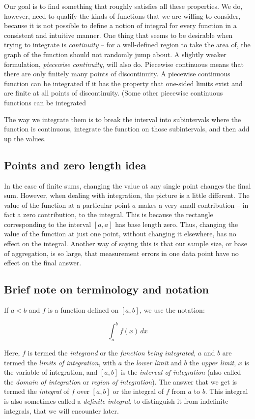 \documentclass{amsart}
\begin{document}
Our goal is to find something that roughly satisfies all these
properties. We do, however, need to qualify the kinds of functions
that we are willing to consider, because it is not possible to define
a notion of integral for every function in a consistent and intuitive
manner. One thing that seems to be desirable when trying to integrate
is {\em continuity} -- for a well-defined region to take the area of,
the graph of the function should not randomly jump about. A slightly
weaker formulation, {\em piecewise continuity}, will also
do. Piecewise continuous means that there are only finitely many
points of discontinuity. A piecewise continuous function can be
integrated if it has the property that one-sided limits exist and are
finite at all points of discontinuity. (Some other piecewise
continuous functions can be integrated 

The way we integrate them is to break the interval into subintervals
where the function is continuous, integrate the function on those
subintervals, and then add up the values.

\subsection{Points and zero length idea}

In the case of finite sums, changing the value at any single point
changes the final sum. However, when dealing with integration, the
picture is a little different. The value of the function at a
particular point $a$ makes a very small contribution -- in fact a zero
contribution, to the integral. This is because the rectangle
corresponding to the interval $[a,a]$ has base length zero. Thus,
changing the value of the function at just one point, without changing
it elsewhere, has no effect on the integral. Another way of saying
this is that our sample size, or base of aggregation, is so large,
that measurement errors in one data point have no effect on the final
answer.

\subsection{Brief note on terminology and notation}

If $a < b$ and $f$ is a function defined on $[a,b]$, we use the notation:

$$\int_a^b f(x) \, dx$$

Here, $f$ is termed the {\em integrand} or the {\em function being
integrated}, $a$ and $b$ are termed the {\em limits of integration},
with $a$ the {\em lower limit} and $b$ the {\em upper limit}, $x$ is
the variable of integration, and $[a,b]$ is the {\em interval of
integration} (also called the {\em domain of integration} or {\em
region of integration}). The answer that we get is termed the {\em
integral} of $f$ over $[a,b]$ or the integral of $f$ from $a$ to
$b$. This integral is also sometimes called a {\em definite
integral}, to distinguish it from indefinite integrals, that we will
encounter later.
\end{document}
